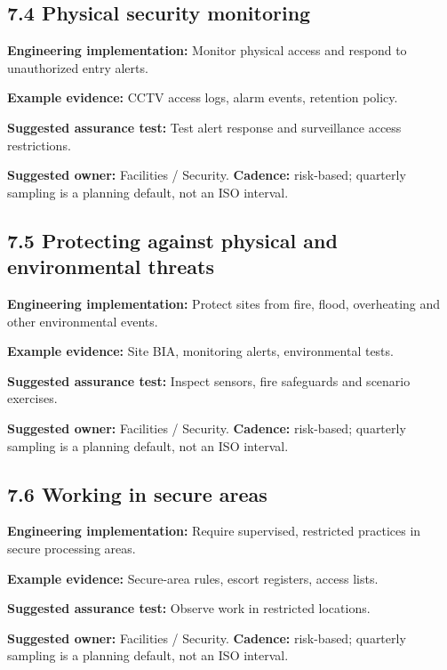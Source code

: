 \documentclass[11pt,letterpaper]{article}
\begin{document}
\subsection{7.4 Physical security monitoring}
\textbf{Engineering implementation:} Monitor physical access and respond to unauthorized entry alerts.\par
\textbf{Example evidence:} CCTV access logs, alarm events, retention policy.\par
\textbf{Suggested assurance test:} Test alert response and surveillance access restrictions.\par
\textbf{Suggested owner:} Facilities / Security. \textbf{Cadence:} risk-based; quarterly sampling is a planning default, not an ISO interval.\par
{}
\subsection{7.5 Protecting against physical and environmental threats}
\textbf{Engineering implementation:} Protect sites from fire, flood, overheating and other environmental events.\par
\textbf{Example evidence:} Site BIA, monitoring alerts, environmental tests.\par
\textbf{Suggested assurance test:} Inspect sensors, fire safeguards and scenario exercises.\par
\textbf{Suggested owner:} Facilities / Security. \textbf{Cadence:} risk-based; quarterly sampling is a planning default, not an ISO interval.\par
{}
\subsection{7.6 Working in secure areas}
\textbf{Engineering implementation:} Require supervised, restricted practices in secure processing areas.\par
\textbf{Example evidence:} Secure-area rules, escort registers, access lists.\par
\textbf{Suggested assurance test:} Observe work in restricted locations.\par
\textbf{Suggested owner:} Facilities / Security. \textbf{Cadence:} risk-based; quarterly sampling is a planning default, not an ISO interval.\par
{}
\end{document}
